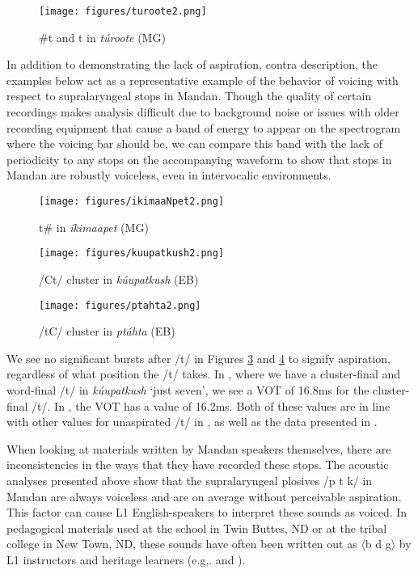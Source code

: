 \begin{figure}
\caption{\#t and {\longrule}t{\longrule} in \textit{túroote} (MG)}\label{wordinitialT}
\texttt{[image: figures/turoote2.png]}
\end{figure}

In addition to demonstrating the lack of aspiration, contra  description, the examples below act as a representative example of the behavior of voicing with respect to supralaryngeal stops in Mandan. Though the quality of certain recordings makes analysis difficult due to background noise or issues with older recording equipment that cause a band of energy to appear on the spectrogram where the voicing bar should be, we can compare this band with the lack of periodicity to any stops on the accompanying waveform to show that stops in Mandan are robustly voiceless, even in intervocalic environments.


\begin{figure}
\caption{t{\#} in \textit{íkimaapet} (MG)}\label{wordfinalT}
\texttt{[image: figures/ikimaaNpet2.png]}
\end{figure}






\begin{figure}
\caption{/Ct/ cluster in \textit{kúupatkush} (EB)}\label{CTcluster}
\texttt{[image: figures/kuupatkush2.png]}
\end{figure}


\begin{figure}
\caption{/tC/ cluster in \textit{ptáhta} (EB)}\label{TCcluster}
\texttt{[image: figures/ptahta2.png]}
\end{figure}


We see no significant bursts after /t/ in Figures \ref{CTcluster} and \ref{TCcluster} to signify aspiration, regardless of what position the /t/ takes. In , where we have a cluster-final and word-final /t/ in \textit{kúupatkush} `just seven', we see a VOT of 16.8ms for the cluster-final /t/. In , the VOT has a value of 16.2ms. Both of these values are in line with other values for unaspirated /t/ in \citet[219]{choladefoged1999}, as well as the data presented in \citet{torres2013a}.

When looking at materials written by Mandan speakers themselves, there are inconsistencies in the ways that they have recorded these stops. The acoustic analyses presented above show that the supralaryngeal plosives /p t k/ in Mandan are always voiceless and are on average without perceivable aspiration. This factor can cause L1 English-speakers to interpret these sounds as voiced. In pedagogical materials used at the school in Twin Buttes, ND or at the tribal college in New Town, ND, these sounds have often been written out as $\langle$b d g$\rangle$ by L1 instructors and heritage learners (e.g,. \citealt{littleowl1992} and \citealt{benson2000}).


